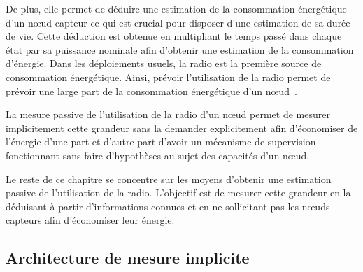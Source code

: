 De plus, elle permet de déduire une estimation de la consommation énergétique d'un nœud capteur ce qui est crucial pour disposer d'une estimation de sa durée de vie.
Cette déduction est obtenue en multipliant le temps passé dans chaque état par sa puissance nominale afin d'obtenir une estimation de la consommation d'énergie.
Dans les déploiements usuels, la radio est la première source de consommation énergétique.
Ainsi, prévoir l'utilisation de la radio permet de prévoir une large part de la consommation énergétique d'un nœud~\cite{molina2010energy}.

La mesure passive de l'utilisation de la radio d'un nœud permet de mesurer implicitement cette grandeur sans la demander explicitement afin d'économiser de l'énergie d'une part et d'autre part d'avoir un mécanisme de supervision fonctionnant sans faire d'hypothèses au sujet des capacités d'un nœud.

Le reste de ce chapitre se concentre sur les moyens d'obtenir une estimation passive de l'utilisation de la radio.
L'objectif est de mesurer cette grandeur en la déduisant à partir d'informations connues et en ne sollicitant pas les nœuds capteurs afin d'économiser leur énergie.

\subsection{Architecture de mesure implicite}
\label{supervision:architecture}

